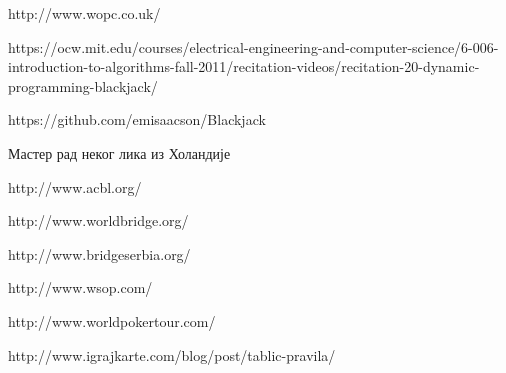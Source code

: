 \documentclass[a4paper, 12pt, ngerman]{article}
\begin{document}
\begin{thebibliography}{9}

http://www.wopc.co.uk/

https://ocw.mit.edu/courses/electrical-engineering-and-computer-science/6-006-introduction-to-algorithms-fall-2011/recitation-videos/recitation-20-dynamic-programming-blackjack/

https://github.com/emisaacson/Blackjack

Мастер рад неког лика из Холандије

http://www.acbl.org/

http://www.worldbridge.org/

http://www.bridgeserbia.org/

http://www.wsop.com/

http://www.worldpokertour.com/

http://www.igrajkarte.com/blog/post/tablic-pravila/

\end{thebibliography}
\end{document}

